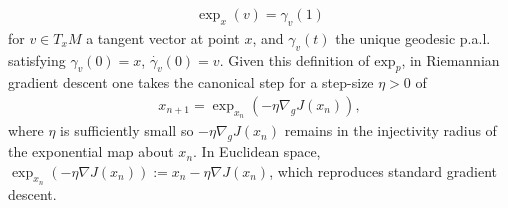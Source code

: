 \documentclass[reqno,11pt,letterpaper]{amsart}
\theoremstyle{plain}
\theoremstyle{definition}
\theoremstyle{remark}
\newcommand{\rgrad}{\nabla_{\!g}}
\newcommand{\expp}{\mathrm{exp}_{p}}
\begin{document}
\begin{align*}
\exp_{x} (v) = \gamma_v(1) 
\end{align*}
for $v \in T_{x} M$ a tangent vector at point $x$, and $\gamma_{v}(t)$ the unique geodesic p.a.l. satisfying $\gamma_{v}(0) = x$, $\Dot{\gamma_{v}}(0) = v$. Given this definition of $\expp$, in Riemannian gradient descent one takes the canonical step for a step-size $\eta > 0$ of
\begin{align*}
    x_{n+1} = \exp_{x_{n}} (- \eta \rgrad J (x_{n})),
\end{align*}
where $\eta$ is sufficiently small so $- \eta \rgrad J (x_{n})$ remains in the injectivity radius of the exponential map about $x_{n}$. In Euclidean space, $\exp_{x_{n}}(-\eta \nabla J (x_{n})) := x_{n} - \eta \nabla J (x_{n})$, which reproduces standard gradient descent.
\end{document}
